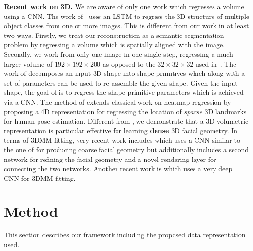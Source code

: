 \textbf{Recent work on 3D.} We are aware of only one
work which regresses a volume using a CNN. The work
of~\cite{choy20163d} uses an LSTM to regress the 3D structure of
multiple object classes from one or more images. This is different from our work in at least two ways. Firstly, we treat our reconstruction as a semantic segmentation problem by regressing a volume which is spatially aligned with the image. Secondly, we work from only one image in one single step, regressing a much larger volume of $192\times 192\times 200$ as opposed to the $32\times 32\times 32$ used in~\cite{choy20163d}. The work of \cite{tulsiani2016learning} decomposes an input 3D shape into shape primitives which along with a set of  parameters can be used to re-assemble the given shape. Given the input shape, the goal of \cite{tulsiani2016learning} is to regress the shape primitive parameters which is achieved via a CNN. The method of \cite{pavlakos2016coarse} extends classical work on heatmap regression \cite{tompson2015efficient, pfister2015flowing} by proposing a 4D representation for regressing the location of \textit{sparse} 3D landmarks for human pose estimation. Different from \cite{pavlakos2016coarse}, we demonstrate that a 3D volumetric representation is particular effective for learning \textbf{dense} 3D facial geometry. In terms of 3DMM fitting, very recent work includes  \cite{richardson2016learning} which uses a CNN similar to the one of \cite{zhu2016face} for producing coarse facial geometry but additionally includes a second network for refining the facial geometry and a novel rendering layer for connecting the two networks. Another recent work is \cite{tran2016regressing} which uses a very deep CNN for 3DMM fitting.



\section{Method}


This section describes our framework including the proposed data representation used.


